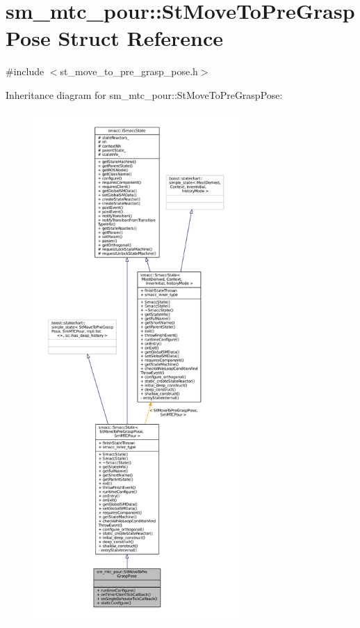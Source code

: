 \hypertarget{structsm__mtc__pour_1_1StMoveToPreGraspPose}{}\section{sm\+\_\+mtc\+\_\+pour\+:\+:St\+Move\+To\+Pre\+Grasp\+Pose Struct Reference}
\label{structsm__mtc__pour_1_1StMoveToPreGraspPose}


{\ttfamily \#include $<$st\+\_\+move\+\_\+to\+\_\+pre\+\_\+grasp\+\_\+pose.\+h$>$}



Inheritance diagram for sm\+\_\+mtc\+\_\+pour\+:\+:St\+Move\+To\+Pre\+Grasp\+Pose\+:
\nopagebreak
\begin{figure}[H]
\begin{center}
\leavevmode
\includegraphics[height=550pt]{structsm__mtc__pour_1_1StMoveToPreGraspPose__inherit__graph}
\end{center}
\end{figure}


